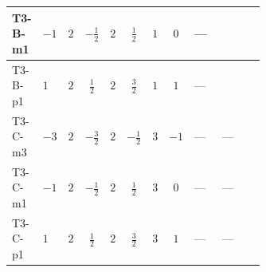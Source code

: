 \documentclass[8pt]{article}
\begin{document}
\begin{landscape}
\begin{longtable}{@{}llcccccc >{\raggedright\arraybackslash}p{0.21\linewidth} >{\raggedright\arraybackslash}p{0.21\linewidth} >{\raggedright\arraybackslash}p{0.21\linewidth}@{}}
\midrule
T3-B-m1 & $-1$ & $2$ & $-\frac{1}{2}$ & $2$ & $\frac{1}{2}$ & $1$ & $0$ & --- & \scriptsize\adjustbox{max width=\linewidth}{$\begin{gathered} {\lambda_{HS_2}^{(A)}} (2 T_{\nu}^{(2)}+6 \operatorname{Tr}\!\left({Y_d}\,\left({Y_d}\right)^{\dagger}\right)+2 \operatorname{Tr}\!\left({Y_e}\,\left({Y_e}\right)^{\dagger}\right)+6 \operatorname{Tr}\!\left({Y_u}\,\left({Y_u}\right)^{\dagger}\right))\end{gathered}$} & \scriptsize\adjustbox{max width=\linewidth}{$\begin{gathered} +8 \operatorname{Tr}\!\left({y_2}\,\left({y_2}\right)^{\dagger}\,{Y_e}\,\left({Y_e}\right)^{\dagger}\right)\end{gathered}$} \\
\midrule
T3-B-p1 & $1$ & $2$ & $\frac{1}{2}$ & $2$ & $\frac{3}{2}$ & $1$ & $1$ & --- & \scriptsize\adjustbox{max width=\linewidth}{$\begin{gathered} {\lambda_{HS_2}^{(A)}} (2 T_{\nu}^{(2)}+6 \operatorname{Tr}\!\left({Y_d}\,\left({Y_d}\right)^{\dagger}\right)+2 \operatorname{Tr}\!\left({Y_e}\,\left({Y_e}\right)^{\dagger}\right)+6 \operatorname{Tr}\!\left({Y_u}\,\left({Y_u}\right)^{\dagger}\right))\end{gathered}$} & \scriptsize\adjustbox{max width=\linewidth}{$\begin{gathered} +8 \operatorname{Tr}\!\left({y_2}\,\left({y_2}\right)^{\dagger}\,{Y_e}\,\left({Y_e}\right)^{\dagger}\right)\end{gathered}$} \\
\midrule
T3-C-m3 & $-3$ & $2$ & $-\frac{3}{2}$ & $2$ & $-\frac{1}{2}$ & $3$ & $-1$ & --- & --- & \scriptsize\adjustbox{max width=\linewidth}{$\begin{gathered} -4 \operatorname{Tr}\!\left({y_2}\,\left({y_2}\right)^{\dagger}\,{Y_e}\,\left({Y_e}\right)^{\dagger}\right)\end{gathered}$} \\
\midrule
T3-C-m1 & $-1$ & $2$ & $-\frac{1}{2}$ & $2$ & $\frac{1}{2}$ & $3$ & $0$ & --- & --- & \scriptsize\adjustbox{max width=\linewidth}{$\begin{gathered} -4 \operatorname{Tr}\!\left({y_2}\,\left({y_2}\right)^{\dagger}\,{Y_e}\,\left({Y_e}\right)^{\dagger}\right)\end{gathered}$} \\
\midrule
T3-C-p1 & $1$ & $2$ & $\frac{1}{2}$ & $2$ & $\frac{3}{2}$ & $3$ & $1$ & --- & --- & \scriptsize\adjustbox{max width=\linewidth}{$\begin{gathered} -4 \operatorname{Tr}\!\left({y_2}\,\left({y_2}\right)^{\dagger}\,{Y_e}\,\left({Y_e}\right)^{\dagger}\right)\end{gathered}$} \\

\end{longtable}
\end{landscape}
\end{document}
